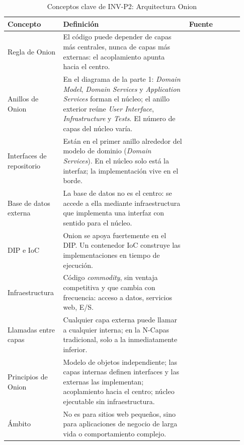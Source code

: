 \begin{table}[htbp]
  \centering
  \small
  \caption{Conceptos clave de INV-P2: Arquitectura Onion}
  \label{tab:inv-p2-onion}
  \begin{tabular}{@{}p{0.2\linewidth}p{0.51\linewidth}p{0.22\linewidth}@{}}
    \toprule
    Concepto & Definición & Fuente \\
    \midrule
    \raggedright Regla de Onion & El código puede depender de capas más centrales, nunca de capas más externas: el acoplamiento apunta hacia el centro. & \raggedright \citep{palermo2008} \tabularnewline
    \raggedright Anillos de Onion & En el diagrama de la parte 1: \emph{Domain Model}, \emph{Domain Services} y \emph{Application Services} forman el núcleo; el anillo exterior reúne \emph{User Interface}, \emph{Infrastructure} y \emph{Tests}. El número de capas del núcleo varía. & \raggedright \citep[texto y diagrama]{palermo2008} \tabularnewline
    \raggedright Interfaces de repositorio & Están en el primer anillo alrededor del modelo de dominio (\emph{Domain Services}). En el núcleo solo está la interfaz; la implementación vive en el borde. & \raggedright \citep[texto y diagrama]{palermo2008} \tabularnewline
    \raggedright Base de datos externa & La base de datos no es el centro: se accede a ella mediante infraestructura que implementa una interfaz con sentido para el núcleo. & \raggedright \citep{palermo2008} \tabularnewline
    \raggedright DIP e IoC & Onion se apoya fuertemente en el DIP. Un contenedor IoC construye las implementaciones en tiempo de ejecución. & \raggedright \parencites{palermo2008}{palermo2008b} \tabularnewline
    \raggedright Infraestructura & Código \emph{commodity}, sin ventaja competitiva y que cambia con frecuencia: acceso a datos, servicios web, E/S. & \raggedright \citep{palermo2008c} \tabularnewline
    \raggedright Llamadas entre capas & Cualquier capa externa puede llamar a cualquier interna; en la N-Capas tradicional, solo a la inmediatamente inferior. & \raggedright \citep{palermo2008c} \tabularnewline
    \raggedright Principios de Onion & Modelo de objetos independiente; las capas internas definen interfaces y las externas las implementan; acoplamiento hacia el centro; núcleo ejecutable sin infraestructura. & \raggedright \citep{palermo2008c} \tabularnewline
    \raggedright Ámbito & No es para sitios web pequeños, sino para aplicaciones de negocio de larga vida o comportamiento complejo. & \raggedright \citep{palermo2008} \tabularnewline
    \bottomrule
  \end{tabular}
\end{table}

